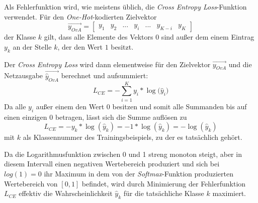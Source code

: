 Als Fehlerfunktion wird, wie meistens üblich, die \textit{Cross Entropy Loss}-Funktion verwendet. Für den \textit{One-Hot}-kodierten Zielvektor
\[\overrightarrow{y_{OvA}} = \begin{bmatrix} y_1 & y_2 & ... & y_i & ... & y_{K-i} & y_K \end{bmatrix}\]
der Klasse $k$ gilt, dass alle Elemente des Vektors $0$ sind außer dem einem Eintrag $y_k$ an der Stelle $k$, der den Wert $1$ besitzt.


Der \textit{Cross Entropy Loss} wird dann elementweise für den Zielvektor $\overrightarrow{y_{OvA}}$ und die Netzausgabe $\overrightarrow{\widehat{y}_{OvA}}$ berechnet und aufsummiert:
\[L_{CE} = - \sum_{i=1}^K{y_i * \log{(\widehat{y}_i})}\]
Da alle $y_i$ außer einem den Wert $0$ besitzen und somit alle Summanden bis auf einen einzigen $0$ betragen, lässt sich die Summe auflösen zu 
\[L_{CE} = - y_k * \log{(\widehat{y}_k)} = -1 * \log{(\widehat{y}_k)} = - \log{(\widehat{y}_k)}\]
mit $k$ als Klassennummer des Trainingsbeispiels, zu der es tatsächlich gehört.

Da die Logarithmusfunktion zwischen 0 und 1 streng monoton steigt, aber in diesem Intervall einen negativen Wertebereich produziert und sich bei\\ $log(1)=0$ ihr Maximum in dem von der \textit{Softmax}-Funktion produzierten Wertebereich von $[0, 1]$ befindet, wird durch Minimierung der Fehlerfunktion $L_{CE}$ effektiv die Wahrscheinlichkeit $\widehat{y}_k$ für die tatsächliche Klasse $k$ maximiert.

\newpage

